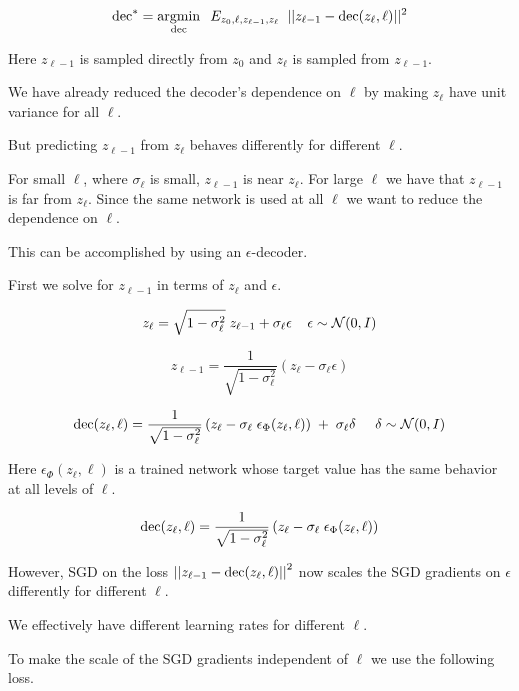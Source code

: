 {$$\mathrm{dec}^* = \operatorname*{argmin}_{\mathrm{dec}}\;\;E_{z_0,\ell,z_{\ell-1},z_\ell} \;\;||z_{\ell-1} - \mathrm{dec}(z_\ell,\ell)||^2$$

\vfill
Here $z_{\ell-1}$ is sampled directly from $z_0$ and $z_\ell$ is sampled from $z_{\ell-1}$.


We have already reduced the decoder's dependence on $\ell$ by making $z_\ell$ have unit variance for all $\ell$.

\vfill
But predicting $z_{\ell-1}$ from $z_\ell$ behaves differently for different $\ell$.

\vfill
For small $\ell$, where $\sigma_\ell$ is small, $z_{\ell-1}$ is near $z_\ell$.
For large $\ell$ we have that $z_{\ell-1}$ is far from $z_\ell$.  Since the same network is used at all $\ell$ we want to reduce the dependence on $\ell$.

\vfill
This can be accomplished by using an $\epsilon$-decoder.


First we solve for $z_{\ell-1}$ in terms of $z_\ell$ and $\epsilon$.

$$z_\ell = \sqrt{1-\sigma^2_\ell}\;z_{\ell-1} + \sigma_\ell \epsilon\;\;\;\;\epsilon \sim {\cal N}(0,I)$$

\vfill
$$z_{\ell-1} = \frac{1}{\sqrt{1-\sigma_\ell^2}}(z_\ell - \sigma_\ell \epsilon)$$

\vfill
$$\mathrm{dec}(z_\ell,\ell) = \frac{1}{\sqrt{1-\sigma_\ell^2}}\left(z_\ell - \sigma_\ell\; \epsilon_\Phi(z_\ell,\ell)\right)\; +\; \sigma_\ell\delta\;\;\;\;\;\delta \sim {\cal N}(0,I)$$

\vfill
Here $\epsilon_\Phi(z_\ell,\ell)$ is a trained network whose target value has the same behavior at all levels of $\ell$.


$$\mathrm{dec}(z_\ell,\ell) = \frac{1}{\sqrt{1-\sigma_\ell^2}}\left(z_\ell - \sigma_\ell\; \epsilon_\Phi(z_\ell,\ell)\right)$$

\vfill
However, SGD on the loss $\left|\left|z_{\ell-1} - \mathrm{dec}(z_\ell,\ell)\right|\right|^2$ now scales the SGD gradients on $\epsilon$ differently for different $\ell$.

\vfill
We effectively have different learning rates for different $\ell$.


To make the scale of the SGD gradients independent of $\ell$ we use the following loss.

}
